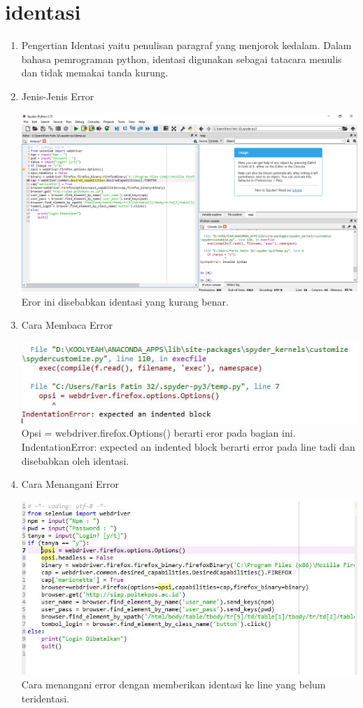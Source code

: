 \section{identasi}
\begin{enumerate}
\item Pengertian
Identasi yaitu penulisan paragraf yang menjorok kedalam. Dalam bahasa pemrograman python, identasi digunakan sebagai tatacara menulis dan tidak memakai tanda kurung.

\item{Jenis-Jenis Error}

\includegraphics{gambar/identasi1.png}
Eror ini disebabkan identasi yang kurang benar.\\


\item{Cara Membaca Error}

\includegraphics{gambar/identasi3.jpg}
Opsi = webdriver.firefox.Options() berarti eror pada bagian ini.
IndentationError: expected an indented block berarti error pada line tadi dan disebabkan oleh identasi.\\


\item{Cara Menangani Error}

\includegraphics{gambar/identasi4.jpg}
Cara menangani error dengan memberikan identasi ke line yang belum teridentasi.\\

\end{enumerate}